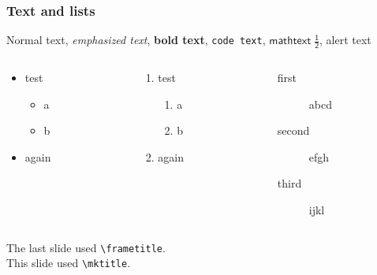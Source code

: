 \begin{frame}
	\frametitle{Text and lists}
	Normal text,
	\emph{emphasized text},
	\textbf{bold text},
	\texttt{code text},
	$\mathsf{math text\;\frac{1}{2}}$,
	\alert{alert text}
	\begin{columns}
		\begin{column}{.33\textwidth}
			\begin{itemize}
				\item test
					\begin{itemize}
						\item a
						\item b
					\end{itemize}
				\item again
			\end{itemize}
		\end{column}
		\begin{column}{.33\textwidth}
			\begin{enumerate}
				\item test
					\begin{enumerate}
						\item a
						\item b
					\end{enumerate}
				\item again
			\end{enumerate}
		\end{column}
		\begin{column}{.33\textwidth}
			\begin{description}
				\item[first] abcd
				\item[second] efgh
				\item[third] ijkl
			\end{description}
		\end{column}
	\end{columns}
\end{frame}

\begin{frame}

	The last slide used \texttt{\textbackslash{frametitle}}.\\
	This slide used \texttt{\textbackslash{mktitle}}.
\end{frame}
